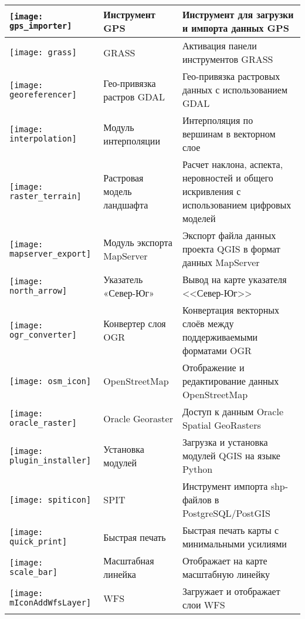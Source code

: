 {\begin{longtable}{|p{1.2cm}|p{3.8cm}|p{10.5cm}|}
\hline
\texttt{[image: gps\_importer]}
 & Инструмент GPS \index{plugins!gps}& Инструмент для загрузки и импорта данных GPS\\
\hline
\texttt{[image: grass]}
 & GRASS \index{plugin!grass toolbox} & Активация панели инструментов GRASS\\
\hline
\texttt{[image: georeferencer]}
 & Гео-привязка растров GDAL \index{plugin!georeferencer} & Гео-привязка растровых данных с использованием GDAL\\
\hline
\texttt{[image: interpolation]}
& Модуль интерполяции \index{plugins!Interpolation}& Интерполяция по вершинам в векторном слое\\
\hline
\texttt{[image: raster\_terrain]}
& Растровая модель ландшафта \index{plugins!Raster Terrain Modelling}& Расчет наклона, аспекта,
неровностей и общего искривления с использованием цифровых моделей\\
\hline
\texttt{[image: mapserver\_export]}
& Модуль экспорта MapServer \index{plugins!MapServer Export}& Экспорт файла данных проекта QGIS в формат данных MapServer \\
\hline
\texttt{[image: north\_arrow]}
& Указатель «Север-Юг» \index{plugins!north arrow}& Вывод на карте указателя <<Север-Юг>>\\
\hline
\texttt{[image: ogr\_converter]}
 & Конвертер слоя OGR \index{plugins!OGR converter} & Конвертация векторных слоёв между поддерживаемыми форматами  OGR\\
\hline
\texttt{[image: osm\_icon]}
 & OpenStreetMap & Отображение и редактирование данных  OpenStreetMap\\
\hline
\texttt{[image: oracle\_raster]}
 & Oracle Georaster \index{plugins!georaster}& Доступ к данным  Oracle Spatial GeoRasters\\
\hline
\texttt{[image: plugin\_installer]}
 & Установка модулей \index{plugins!Plugin Installer} & Загрузка и установка модулей QGIS на языке Python\\
\hline
\texttt{[image: spiticon]}
 & SPIT \index{plugins!spit}& Инструмент импорта shp-файлов в  PostgreSQL/PostGIS\\
\hline
\texttt{[image: quick\_print]}
 & Быстрая печать \index{plugins!quick print}& Быстрая печать карты с минимальными усилиями\\
\hline
\texttt{[image: scale\_bar]}
 & Масштабная линейка \index{plugins!scalebar}& Отображает на карте масштабную линейку\\
\hline
\texttt{[image: mIconAddWfsLayer]}
 & WFS & Загружает и отображает слои WFS\\
\hline
\end{longtable}}
